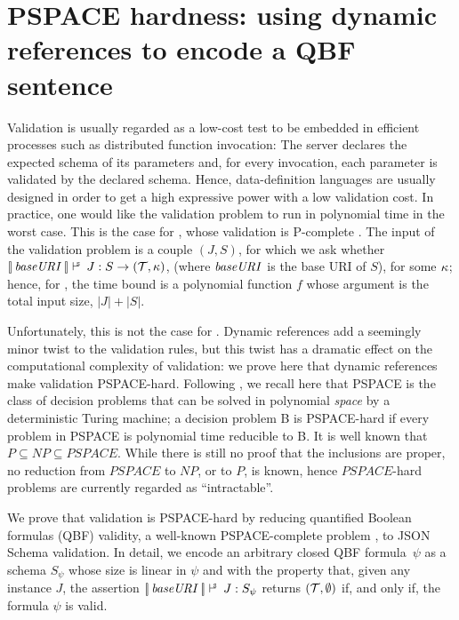 \section{PSPACE hardness: using dynamic references to encode a QBF sentence}\label{sec:hardness}


Validation is usually regarded as a low-cost test to be embedded in efficient processes such as distributed function invocation: The server
declares the expected schema of its parameters and, for every invocation, each parameter is validated by the declared schema. 
Hence, data-definition languages are usually designed in order to get a high expressive power with a low validation cost.
In practice, one would like the validation problem to run in polynomial time in the worst case.
This is the case for {\cJS}, whose validation is P-complete \cite{DBLP:conf/www/PezoaRSUV16}.
The input of the validation problem is a couple $(J,S)$, for which we ask whether $\SJudg{\List{\key{baseURI}}}{J}{S}\Ret{\btrue}(\btrue,\ps)$,
(where $\mathit{baseURI}$ is the base URI of $S$),
for some $\kappa$;
hence, for {\cJS}, the time bound is a polynomial function $f$ whose argument
is the total input size, $|J|+|S|$.

Unfortunately, this is not the case for {\mJS}.
Dynamic references add a seemingly minor twist to the validation rules, but this twist has a dramatic effect on the computational
complexity of validation:
we prove here that dynamic references make validation PSPACE-hard.
Following \cite{sipser}, we recall here that PSPACE is the class of decision problems that can be solved in polynomial \emph{space} by a deterministic Turing machine; a decision problem B is PSPACE-hard if every problem in PSPACE is polynomial time reducible to B.
It is well known that $P \subseteq NP \subseteq PSPACE$. While there is still no proof that the inclusions are proper,
no reduction from $PSPACE$ to $NP$, or to $P$, is known, hence $PSPACE$-hard problems are currently regarded as ``intractable''.

We prove that validation is PSPACE-hard by reducing quantified Boolean formulas (QBF) validity, a well-known PSPACE-complete problem \citep{DBLP:conf/stoc/StockmeyerM73},
to JSON Schema validation.  In detail, we encode an arbitrary closed QBF formula~$\psi$ as a schema 
$S_{\psi}$ whose size is linear in $\psi$ and with the property that, given any {\json} instance $J$, the assertion 
$\SJudg{\List{\key{baseURI}}}{J}{S_{\psi}}$ returns $(\mathcal{T},\emptyset)$
if, and only if,  the formula $\psi$ is valid. 



